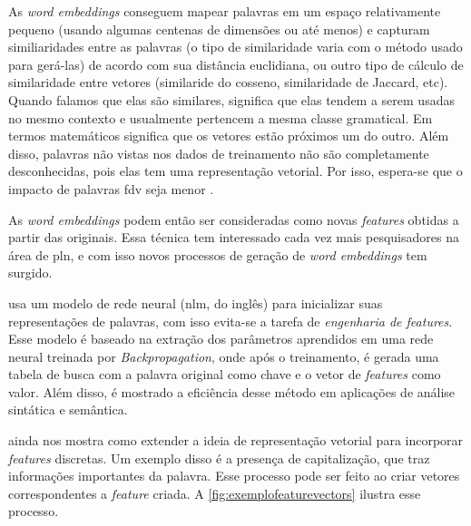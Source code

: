 As \textit{word embeddings} conseguem mapear palavras em um espaço relativamente pequeno (usando algumas centenas de dimensões ou até menos) e capturam similiaridades entre as palavras (o tipo de similaridade varia com o método usado para gerá-las) de acordo com sua distância euclidiana, ou outro tipo de cálculo de similaridade entre vetores (similaride do cosseno, similaridade de Jaccard, etc). Quando falamos que elas são similares, significa que elas tendem a serem usadas no mesmo contexto e usualmente pertencem a mesma classe gramatical. Em termos matemáticos significa que os vetores estão próximos um do outro. Além disso, palavras não vistas nos dados de treinamento não são completamente desconhecidas, pois elas tem uma representação vetorial. Por isso, espera-se que o impacto de palavras \ac{fdv} seja menor \cite{fonseca2015evaluating}.

As \textit{word embeddings} podem então ser consideradas como novas \textit{features} obtidas a partir das originais. Essa técnica tem interessado cada vez mais pesquisadores na área de \ac{pln}, e com isso novos processos de geração de \textit{word embeddings} tem surgido.

 usa um modelo de rede neural (\ac{nlm}, do inglês) para inicializar suas representações de palavras, com isso evita-se a tarefa de \textit{engenharia de features}. Esse modelo é baseado na extração dos parâmetros aprendidos em uma rede neural treinada por \textit{Backpropagation}, onde após o treinamento, é gerada uma tabela de busca com a palavra original como chave e o vetor de \textit{features} como valor. Além disso, é mostrado a eficiência desse método em aplicações de análise sintática e semântica.

 ainda nos mostra como extender a ideia de representação vetorial para incorporar \textit{features} discretas. Um exemplo disso é a presença de capitalização, que traz informações importantes da palavra. Esse processo pode ser feito ao criar vetores correspondentes a \textit{feature} criada. A \autoref{fig:exemplofeaturevectors} ilustra esse processo.

